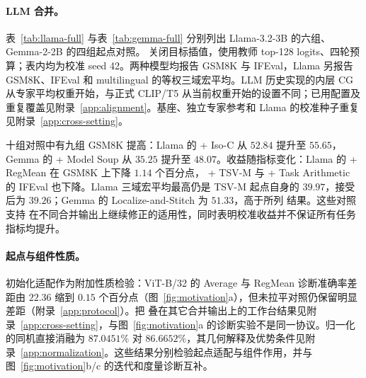 \paragraph{LLM 合并。}
表~\ref{tab:llama-full} 与表~\ref{tab:gemma-full} 分别列出 Llama-3.2-3B 的六组、Gemma-2-2B 的四组起点对照。\method{} 关闭目标插值，使用教师 top-128 logits、四轮预算；表内均为校准 seed 42。两种模型均报告 GSM8K 与 IFEval，Llama 另报告 GSM8K、IFEval 和 multilingual 的等权三域宏平均。LLM 历史实现的内层 CG 从专家平均权重开始，与正式 CLIP/T5 从当前权重开始的设置不同；已用配置及重复覆盖见附录~\ref{app:alignment}。基座、独立专家参考和 Llama 的校准种子重复见附录~\ref{app:cross-setting}。

十组对照中有九组 GSM8K 提高：Llama 的 \method{} + Iso-C 从 $52.84$ 提升至 $55.65$，Gemma 的 \method{} + Model Soup 从 $35.25$ 提升至 $48.07$。收益随指标变化：Llama 的 \method{} + RegMean 在 GSM8K 上下降 $1.14$ 个百分点，\method{} + TSV-M 与 \method{} + Task Arithmetic 的 IFEval 也下降。Llama 三域宏平均最高仍是 TSV-M 起点自身的 $39.97$，接受 \method{} 后为 $39.26$；Gemma 的 Localize-and-Stitch 为 $51.33$，高于所列 \method{} 结果。这些对照支持 \method{} 在不同合并输出上继续修正的适用性，同时表明校准收益并不保证所有任务指标均提升。

\begin{table}[!htbp]
\centering\small
\caption{Llama-3.2-3B：全部六组 \method{} 起点对照（校准 seed 42）。起点为对应方法的合并结果，\method{} 采用四轮预算。差值为相对起点的 GSM8K 百分点增益，按未舍入数计算。}
\label{tab:llama-full}
\setlength{\tabcolsep}{3.4pt}
\resizebox{\textwidth}{!}{}
\end{table}

\begin{table}[!htbp]
\centering\small
\caption{Gemma-2-2B：全部四组 \method{} 起点对照（校准 seed 42、四轮预算）。差值为相对起点的 GSM8K 百分点增益；四组 GSM8K 与 IFEval 均提高。}
\label{tab:gemma-full}

\end{table}

\paragraph{起点与组件性质。}
初始化适配作为附加性质检验：ViT-B/32 的 Average 与 RegMean 诊断准确率差距由 $22.36$ 缩到 $0.15$ 个百分点（图~\ref{fig:motivation}a），但未拉平对照仍保留明显差距（附录~\ref{app:protocol}）。把 \method{} 叠在其它合并输出上的工作台结果见附录~\ref{app:cross-setting}，与图~\ref{fig:motivation}a 的诊断实验不是同一协议。归一化的同机直接消融为 $87.0451\%$ 对 $86.6652\%$，其几何解释及优势条件见附录~\ref{app:normalization}。这些结果分别检验起点适配与组件作用，并与图~\ref{fig:motivation}b/c 的迭代和度量诊断互补。
